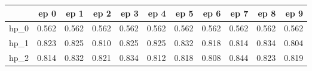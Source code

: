 \begin{tabular}{lrrrrrrrrrr}
\toprule
{} &   ep 0 &   ep 1 &   ep 2 &   ep 3 &   ep 4 &   ep 5 &   ep 6 &   ep 7 &   ep 8 &   ep 9 \\
\midrule
hp\_0 &  0.562 &  0.562 &  0.562 &  0.562 &  0.562 &  0.562 &  0.562 &  0.562 &  0.562 &  0.562 \\
hp\_1 &  0.823 &  0.825 &  0.810 &  0.825 &  0.825 &  0.832 &  0.818 &  0.814 &  0.834 &  0.804 \\
hp\_2 &  0.814 &  0.832 &  0.821 &  0.834 &  0.812 &  0.818 &  0.808 &  0.844 &  0.823 &  0.819 \\
\bottomrule
\end{tabular}
